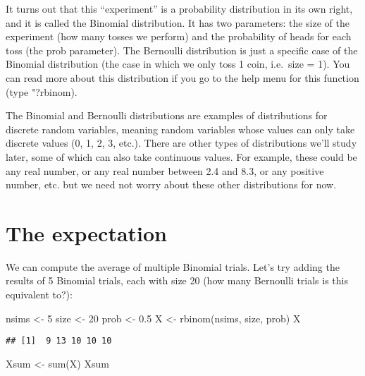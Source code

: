\documentclass[
]{book}
\newenvironment{Shaded}{\begin{snugshade}}{\end{snugshade}}
\newcommand{\DecValTok}[1]{\textcolor[rgb]{0.00,0.00,0.81}{#1}}
\newcommand{\FloatTok}[1]{\textcolor[rgb]{0.00,0.00,0.81}{#1}}
\newcommand{\FunctionTok}[1]{\textcolor[rgb]{0.00,0.00,0.00}{#1}}
\newcommand{\NormalTok}[1]{#1}
\newcommand{\OtherTok}[1]{\textcolor[rgb]{0.56,0.35,0.01}{#1}}
\begin{document}
It turns out that this ``experiment'' is a probability distribution in its own right, and it is called the Binomial distribution. It has two parameters: the size of the experiment (how many tosses we perform) and the probability of heads for each toss (the prob parameter). The Bernoulli distribution is just a specific case of the Binomial distribution (the case in which we only toss 1 coin, i.e.~size = 1). You can read more about this distribution if you go to the help menu for this function (type "?rbinom).

The Binomial and Bernoulli distributions are examples of distributions for discrete random variables, meaning random variables whose values can only take discrete values (0, 1, 2, 3, etc.). There are other types of distributions we'll study later, some of which can also take continuous values. For example, these could be any real number, or any real number between 2.4 and 8.3, or any positive number, etc. but we need not worry about these other distributions for now.

\hypertarget{the-expectation}{%
\section{The expectation}\label{the-expectation}}

We can compute the average of multiple Binomial trials. Let's try adding the results of 5 Binomial trials, each with size 20 (how many Bernoulli trials is this equivalent to?):

\begin{Shaded}
\begin{Highlighting}[]
\NormalTok{nsims }\OtherTok{\textless{}{-}} \DecValTok{5}
\NormalTok{size }\OtherTok{\textless{}{-}} \DecValTok{20}
\NormalTok{prob }\OtherTok{\textless{}{-}} \FloatTok{0.5}
\NormalTok{X }\OtherTok{\textless{}{-}} \FunctionTok{rbinom}\NormalTok{(nsims, size, prob)}
\NormalTok{X}
\end{Highlighting}
\end{Shaded}

\begin{verbatim}
## [1]  9 13 10 10 10
\end{verbatim}

\begin{Shaded}
\begin{Highlighting}[]
\NormalTok{Xsum }\OtherTok{\textless{}{-}} \FunctionTok{sum}\NormalTok{(X)}
\NormalTok{Xsum}
\end{Highlighting}
\end{Shaded}
\end{document}
